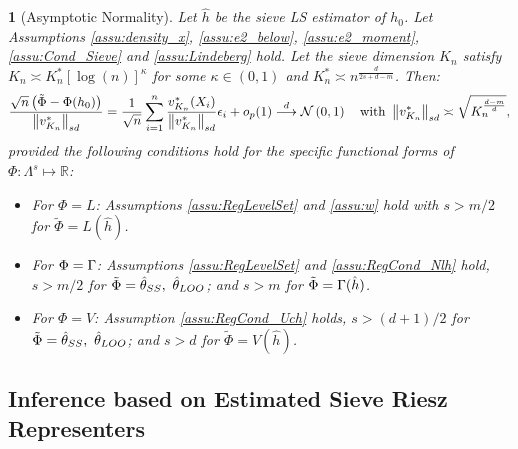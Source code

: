 \documentclass[12pt,american]{article}
\theoremstyle{definition}
\theoremstyle{plain}
\theoremstyle{definition}
\theoremstyle{plain}
\theoremstyle{plain}
\theoremstyle{plain}
\theoremstyle{plain}
\newtheorem{prop}{\protect\propositionname}
\theoremstyle{plain}
\newcommand{\R}{\mathbb{R}}
\newcommand{\norm}[1]{\left\| #1 \right\|}
\providecommand{\propositionname}{Proposition}
\begin{document}
\begin{prop}[Asymptotic Normality]\label{prop:Plug-in_NL} Let $\hat{h}$ be the sieve LS estimator of $h_0$. Let Assumptions \ref{assu:density_x}, \ref{assu:e2_below}, \ref{assu:e2_moment}, \ref{assu:Cond_Sieve} and \ref{assu:Lindeberg} hold. Let the sieve dimension $K_{n}$ satisfy $K_{n}\asymp K^*_n [\log(n)]^{\kappa}$ for some $\kappa \in (0,1)$ and $K_{n}^{*}\asymp n^{\frac{d}{2s+d-m}}$.
  Then:
  \[
    \frac{\sqrt{n}\left(\tilde{\Phi}-\Phi(h_0)\right)}{\norm{v_{K_{n}}^{*}}_{sd}} = \frac{1}{\sqrt{n}}\sum_{i=1}^n \frac{v_{K_n}^*(X_i)}{\norm{v_{K_{n}}^{*}}_{sd}}\e_i +o_p(1)\dto\cN\left(0,1\right)\quad\text{with }\norm{v_{K_{n}}^{*}}_{sd}\asymp\sqrt{K_{n}^{\frac{d-m}{d}}},
  \]
  provided the following conditions hold for the specific functional forms of $\Phi:\Lambda^s \mapsto \R$:
  \begin{itemize}
    \item For $\Phi=L$: Assumptions \ref{assu:RegLevelSet} and \ref{assu:w} hold with $s>m/2$ for $\tilde{\Phi}=L(\hat{h})$.
    \item For $\Phi=\Gamma$: Assumptions \ref{assu:RegLevelSet} and \ref{assu:RegCond_Nlh} hold, $s>m/2$ for $\tilde{\Phi}=\hat{\theta}_{SS},~\hat{\theta}_{LOO}$; and $s>m$ for $\tilde{\Phi}=\Gamma(\hat{h})$.
    \item For $\Phi =V$: Assumption \ref{assu:RegCond_Uch} holds, $s>(d+1)/2$ for $\tilde{\Phi}=\hat{\theta}_{SS},~\hat{\theta}_{LOO}$; and $s>d$ for $\tilde{\Phi}=V(\hat{h})$.
  \end{itemize}
\end{prop}

\subsection{Inference based on Estimated Sieve Riesz Representers}
\end{document}
